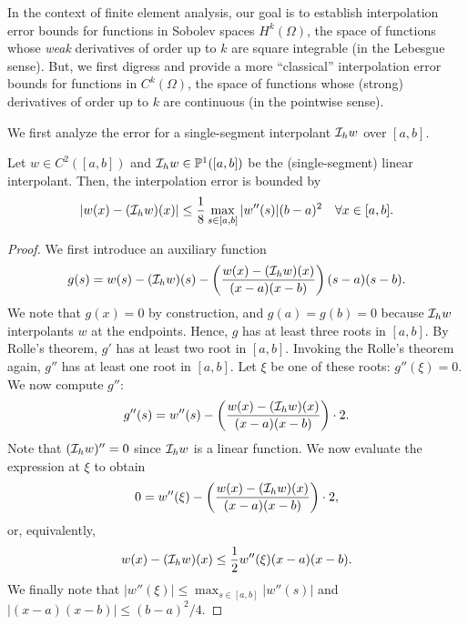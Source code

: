 In the context of finite element analysis,  our goal is to establish interpolation error bounds for functions in Sobolev spaces $H^k(\Omega)$, the space of functions whose \emph{weak} derivatives of order up to $k$ are square integrable (in the Lebesgue sense).  But, we first digress and provide a more ``classical'' interpolation error bounds for functions in $C^k(\Omega)$, the space of functions whose (strong) derivatives of order up to $k$ are continuous (in the pointwise sense).

We first analyze the error for a single-segment interpolant $\mathcal{I}_h w$ over $[a,b]$.
\begin{proposition}
  \label{prop:th_poly_Ck_ref}
  Let $w \in C^2([a,b])$ and $\mathcal{I}_h w \in \mathbb{P}^1([a,b])$ be the (single-segment) linear interpolant. Then, the interpolation error is bounded by
  \begin{equation*}
    | w(x) - (\mathcal{I}_h w)(x) | \leq \frac{1}{8} \max_{s \in [a,b]} |w''(s)| (b-a)^2 \quad \forall x \in [a,b].
  \end{equation*}
  \begin{proof}
    We first introduce an auxiliary function
    \begin{equation*}
      g(s) = w(s) - (\mathcal{I}_h w)(s) - \left( \frac{w(x) - (\mathcal{I}_h w)(x)}{(x-a)(x-b)} \right) (s-a)(s-b).
    \end{equation*}
    We note that $g(x) = 0$ by construction, and $g(a) = g(b) = 0$ because $\mathcal{I}_h w$ interpolants $w$ at the endpoints. Hence, $g$ has at least three roots in $[a,b]$. By Rolle's theorem, $g'$ has at least two root in $[a,b]$.  Invoking the Rolle's theorem again, $g''$ has at least one root in $[a,b]$. Let $\xi$ be one of these roots: $g''(\xi) = 0$. We now compute $g''$:
    \begin{equation*}
      g''(s) = w''(s) -  \left( \frac{w(x) - (\mathcal{I}_h w)(x)}{(x-a)(x-b)} \right) \cdot 2.
    \end{equation*}
    Note that $(\mathcal{I}_h w)'' = 0$ since $\mathcal{I}_h w$ is a linear function. We now evaluate the expression at $\xi$ to obtain
    \begin{equation*}
      0 = w''(\xi) - \left( \frac{w(x) - (\mathcal{I}_h w)(x)}{(x-a)(x-b)} \right) \cdot 2,
    \end{equation*}
    or, equivalently,
    \begin{equation*}
      w(x) - (\mathcal{I}_h w)(x) \leq \frac{1}{2} w''(\xi) (x-a)(x-b).
    \end{equation*}
    We finally note that $|w''(\xi)| \leq \max_{s \in [a,b]}|w''(s)|$ and $| (x-a)(x-b) | \leq (b-a)^2/4$.
  \end{proof}
\end{proposition}
